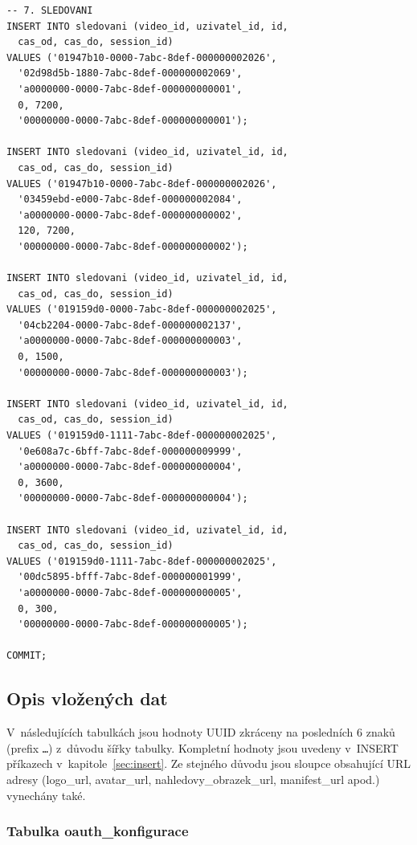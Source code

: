 \documentclass[12pt,a4paper]{article}
\begin{document}
\begin{lstlisting}
-- 7. SLEDOVANI
INSERT INTO sledovani (video_id, uzivatel_id, id,
  cas_od, cas_do, session_id)
VALUES ('01947b10-0000-7abc-8def-000000002026',
  '02d98d5b-1880-7abc-8def-000000002069',
  'a0000000-0000-7abc-8def-000000000001',
  0, 7200,
  '00000000-0000-7abc-8def-000000000001');

INSERT INTO sledovani (video_id, uzivatel_id, id,
  cas_od, cas_do, session_id)
VALUES ('01947b10-0000-7abc-8def-000000002026',
  '03459ebd-e000-7abc-8def-000000002084',
  'a0000000-0000-7abc-8def-000000000002',
  120, 7200,
  '00000000-0000-7abc-8def-000000000002');

INSERT INTO sledovani (video_id, uzivatel_id, id,
  cas_od, cas_do, session_id)
VALUES ('019159d0-0000-7abc-8def-000000002025',
  '04cb2204-0000-7abc-8def-000000002137',
  'a0000000-0000-7abc-8def-000000000003',
  0, 1500,
  '00000000-0000-7abc-8def-000000000003');

INSERT INTO sledovani (video_id, uzivatel_id, id,
  cas_od, cas_do, session_id)
VALUES ('019159d0-1111-7abc-8def-000000002025',
  '0e608a7c-6bff-7abc-8def-000000009999',
  'a0000000-0000-7abc-8def-000000000004',
  0, 3600,
  '00000000-0000-7abc-8def-000000000004');

INSERT INTO sledovani (video_id, uzivatel_id, id,
  cas_od, cas_do, session_id)
VALUES ('019159d0-1111-7abc-8def-000000002025',
  '00dc5895-bfff-7abc-8def-000000001999',
  'a0000000-0000-7abc-8def-000000000005',
  0, 300,
  '00000000-0000-7abc-8def-000000000005');

COMMIT;
\end{lstlisting}

\newpage

\subsection{Opis vložených dat}

V~následujících tabulkách jsou hodnoty UUID zkráceny na posledních 6 znaků
(prefix \texttt{…}) z~důvodu šířky tabulky. Kompletní hodnoty jsou uvedeny
v~INSERT příkazech v~kapitole~\ref{sec:insert}. Ze stejného důvodu jsou sloupce obsahující URL adresy
(logo\_url, avatar\_url, nahledovy\_obrazek\_url, manifest\_url apod.) vynechány také.

\subsubsection{Tabulka oauth\_konfigurace}
\end{document}
